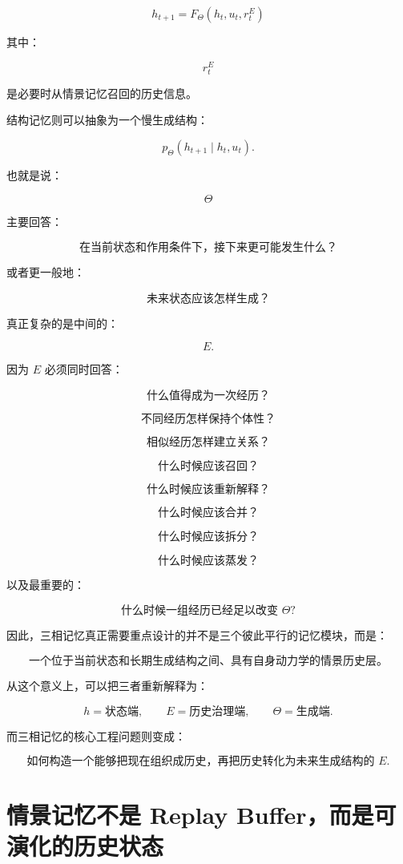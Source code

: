 \[
\boxed{
h_{t+1}
=
F_{\Theta}
\left(
h_t,
u_t,
r_t^E
\right)
}
\]

其中：

\[
r_t^E
\]

是必要时从情景记忆召回的历史信息。

结构记忆则可以抽象为一个慢生成结构：

\[
\boxed{
p_{\Theta}
\left(
h_{t+1}
\mid
h_t,u_t
\right).
}
\]

也就是说：

\[
\Theta
\]

主要回答：

\[
\boxed{
\text{在当前状态和作用条件下，接下来更可能发生什么？}
}
\]

或者更一般地：

\[
\boxed{
\text{未来状态应该怎样生成？}
}
\]

真正复杂的是中间的：

\[
E.
\]

因为 \(E\) 必须同时回答：

\[
\text{什么值得成为一次经历？}
\]

\[
\text{不同经历怎样保持个体性？}
\]

\[
\text{相似经历怎样建立关系？}
\]

\[
\text{什么时候应该召回？}
\]

\[
\text{什么时候应该重新解释？}
\]

\[
\text{什么时候应该合并？}
\]

\[
\text{什么时候应该拆分？}
\]

\[
\text{什么时候应该蒸发？}
\]

以及最重要的：

\[
\boxed{
\text{什么时候一组经历已经足以改变 }\Theta?
}
\]

因此，三相记忆真正需要重点设计的并不是三个彼此平行的记忆模块，而是：

\[
\boxed{
\textbf{
一个位于当前状态和长期生成结构之间、具有自身动力学的情景历史层。
}
}
\]

从这个意义上，可以把三者重新解释为：

\[
\boxed{
h=\text{状态端},
\qquad
E=\text{历史治理端},
\qquad
\Theta=\text{生成端}.
}
\]

而三相记忆的核心工程问题则变成：

\[
\boxed{
\textbf{
如何构造一个能够把现在组织成历史，再把历史转化为未来生成结构的 }E.
}
\]


\section{情景记忆不是 Replay Buffer，而是可演化的历史状态}

